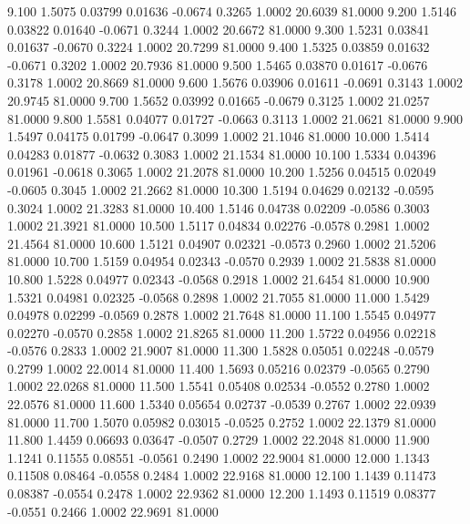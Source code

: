    9.100   1.5075   0.03799   0.01636  -0.0674   0.3265   1.0002  20.6039  81.0000
   9.200   1.5146   0.03822   0.01640  -0.0671   0.3244   1.0002  20.6672  81.0000
   9.300   1.5231   0.03841   0.01637  -0.0670   0.3224   1.0002  20.7299  81.0000
   9.400   1.5325   0.03859   0.01632  -0.0671   0.3202   1.0002  20.7936  81.0000
   9.500   1.5465   0.03870   0.01617  -0.0676   0.3178   1.0002  20.8669  81.0000
   9.600   1.5676   0.03906   0.01611  -0.0691   0.3143   1.0002  20.9745  81.0000
   9.700   1.5652   0.03992   0.01665  -0.0679   0.3125   1.0002  21.0257  81.0000
   9.800   1.5581   0.04077   0.01727  -0.0663   0.3113   1.0002  21.0621  81.0000
   9.900   1.5497   0.04175   0.01799  -0.0647   0.3099   1.0002  21.1046  81.0000
  10.000   1.5414   0.04283   0.01877  -0.0632   0.3083   1.0002  21.1534  81.0000
  10.100   1.5334   0.04396   0.01961  -0.0618   0.3065   1.0002  21.2078  81.0000
  10.200   1.5256   0.04515   0.02049  -0.0605   0.3045   1.0002  21.2662  81.0000
  10.300   1.5194   0.04629   0.02132  -0.0595   0.3024   1.0002  21.3283  81.0000
  10.400   1.5146   0.04738   0.02209  -0.0586   0.3003   1.0002  21.3921  81.0000
  10.500   1.5117   0.04834   0.02276  -0.0578   0.2981   1.0002  21.4564  81.0000
  10.600   1.5121   0.04907   0.02321  -0.0573   0.2960   1.0002  21.5206  81.0000
  10.700   1.5159   0.04954   0.02343  -0.0570   0.2939   1.0002  21.5838  81.0000
  10.800   1.5228   0.04977   0.02343  -0.0568   0.2918   1.0002  21.6454  81.0000
  10.900   1.5321   0.04981   0.02325  -0.0568   0.2898   1.0002  21.7055  81.0000
  11.000   1.5429   0.04978   0.02299  -0.0569   0.2878   1.0002  21.7648  81.0000
  11.100   1.5545   0.04977   0.02270  -0.0570   0.2858   1.0002  21.8265  81.0000
  11.200   1.5722   0.04956   0.02218  -0.0576   0.2833   1.0002  21.9007  81.0000
  11.300   1.5828   0.05051   0.02248  -0.0579   0.2799   1.0002  22.0014  81.0000
  11.400   1.5693   0.05216   0.02379  -0.0565   0.2790   1.0002  22.0268  81.0000
  11.500   1.5541   0.05408   0.02534  -0.0552   0.2780   1.0002  22.0576  81.0000
  11.600   1.5340   0.05654   0.02737  -0.0539   0.2767   1.0002  22.0939  81.0000
  11.700   1.5070   0.05982   0.03015  -0.0525   0.2752   1.0002  22.1379  81.0000
  11.800   1.4459   0.06693   0.03647  -0.0507   0.2729   1.0002  22.2048  81.0000
  11.900   1.1241   0.11555   0.08551  -0.0561   0.2490   1.0002  22.9004  81.0000
  12.000   1.1343   0.11508   0.08464  -0.0558   0.2484   1.0002  22.9168  81.0000
  12.100   1.1439   0.11473   0.08387  -0.0554   0.2478   1.0002  22.9362  81.0000
  12.200   1.1493   0.11519   0.08377  -0.0551   0.2466   1.0002  22.9691  81.0000
